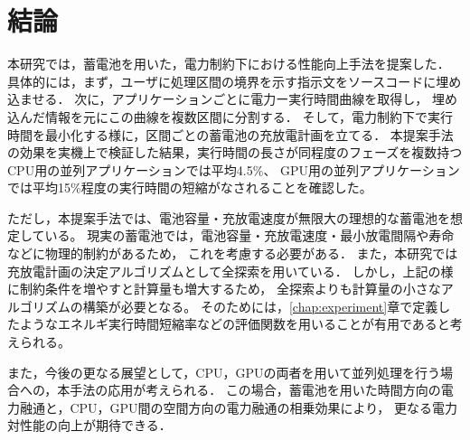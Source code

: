 \chapter{結論}
\label{chap:conclusion}


本研究では，蓄電池を用いた，電力制約下における性能向上手法を提案した．
具体的には，まず，ユーザに処理区間の境界を示す指示文をソースコードに埋め込ませる．
次に，アプリケーションごとに電力ー実行時間曲線を取得し，
埋め込んだ情報を元にこの曲線を複数区間に分割する．
そして，電力制約下で実行時間を最小化する様に，区間ごとの蓄電池の充放電計画を立てる．
本提案手法の効果を実機上で検証した結果，実行時間の長さが同程度のフェーズを複数持つCPU用の並列アプリケーションでは平均4.5\%、
GPU用の並列アプリケーションでは平均15\%程度の実行時間の短縮がなされることを確認した。


ただし，本提案手法では、電池容量・充放電速度が無限大の理想的な蓄電池を想定している。
現実の蓄電池では，電池容量・充放電速度・最小放電間隔や寿命などに物理的制約があるため，
これを考慮する必要がある．
また，本研究では充放電計画の決定アルゴリズムとして全探索を用いている．
しかし，上記の様に制約条件を増やすと計算量も増大するため，
全探索よりも計算量の小さなアルゴリズムの構築が必要となる。
そのためには，\ref{chap:experiment}章で定義したようなエネルギ実行時間短縮率などの評価関数を用いることが有用であると考えられる。


また，今後の更なる展望として，CPU，GPUの両者を用いて並列処理を行う場合への，本手法の応用が考えられる．
この場合，蓄電池を用いた時間方向の電力融通と，CPU，GPU間の空間方向の電力融通の相乗効果により，
更なる電力対性能の向上が期待できる．

